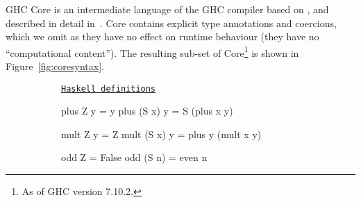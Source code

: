 GHC Core is an intermediate language of the \textsc{GHC} compiler based on
\fc{}, and described in detail in~\cite[Appendix C]{sulzmann2007system}. Core
contains explicit type annotations and coercions, which we omit as they have no
effect on runtime behaviour (they have no ``computational content''). The
resulting sub-set of Core\footnote{As of GHC version 7.10.2.} is shown in
Figure~\ref{fig:coresyntax}.

\begin{figure}
  \begin{subfigure}[haskell]{\textwidth}
    \underline{\texttt{Haskell definitions}}
    \begin{haskell}
plus    Z  y = y
plus (S x) y = S      (plus x y)

mult    Z  y = Z
mult (S x) y = plus y (mult x y)

odd     Z  = False
odd  (S n) = even n


\end{haskell}
\end{subfigure}
\end{figure}
